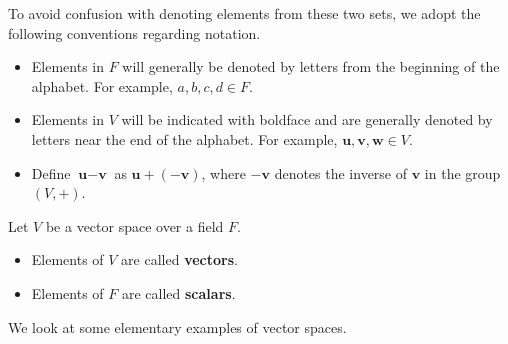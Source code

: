 To avoid confusion with denoting elements from these two sets, we adopt the following conventions regarding notation.
\begin{itemize}
    \item Elements in $F$ will generally be denoted by letters from the beginning of the alphabet. For example, $a, b, c, d \in F$.
    \item Elements in $V$ will be indicated with boldface and are generally denoted by letters near the end of the alphabet. For example, $\textbf{u}, \textbf{v}, \textbf{w} \in V$.
    \item Define $\textbf{u} - \textbf{v}$ as $\textbf{u} + (-\textbf{v})$, where $-\textbf{v}$ denotes the inverse of $\textbf{v}$ in the group $(V, +)$.
\end{itemize}

\begin{definition}
    Let $V$ be a vector space over a field $F$.
    \begin{itemize}
        \item Elements of $V$ are called \textbf{vectors}.
        \item Elements of $F$ are called \textbf{scalars}.
    \end{itemize}
\end{definition}

We look at some elementary examples of vector spaces.

